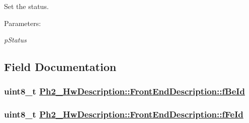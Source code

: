 Set the status. 

\begin{Desc}
\item[Parameters:]
\begin{description}
\item[{\em p\-Status}]\end{description}
\end{Desc}


\subsection{Field Documentation}
\hypertarget{class_ph2___hw_description_1_1_front_end_description_9ad4c11d4b00f0e1325843cfceac2e7c}{
\subsubsection[fBeId]{\setlength{\rightskip}{0pt plus 5cm}uint8\_\-t \hyperlink{class_ph2___hw_description_1_1_front_end_description_9ad4c11d4b00f0e1325843cfceac2e7c}{Ph2\_\-Hw\-Description::Front\-End\-Description::f\-Be\-Id}}}
\label{class_ph2___hw_description_1_1_front_end_description_9ad4c11d4b00f0e1325843cfceac2e7c}


\hypertarget{class_ph2___hw_description_1_1_front_end_description_11b388f8d0f3259e5355779b36e75d9f}{
\subsubsection[fFeId]{\setlength{\rightskip}{0pt plus 5cm}uint8\_\-t \hyperlink{class_ph2___hw_description_1_1_front_end_description_11b388f8d0f3259e5355779b36e75d9f}{Ph2\_\-Hw\-Description::Front\-End\-Description::f\-Fe\-Id}}}
\label{class_ph2___hw_description_1_1_front_end_description_11b388f8d0f3259e5355779b36e75d9f}


